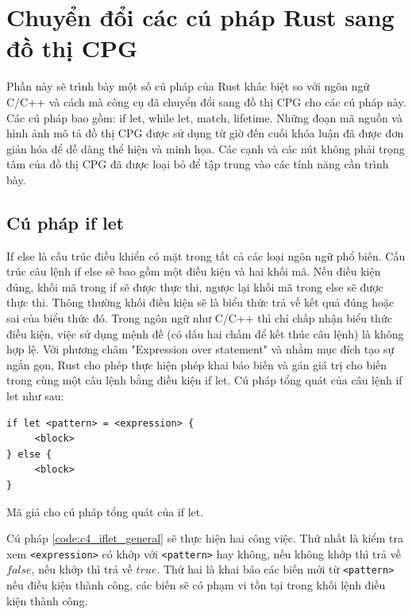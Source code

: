 \section{Chuyển đổi các cú pháp Rust sang đồ thị CPG}

Phần này sẽ trình bày một số cú pháp của Rust khác biệt so với ngôn ngữ C/C++ và cách mà công cụ đã chuyển đổi sang đồ thị CPG cho các cú pháp này.
Các cú pháp bao gồm: if let, while let, match, lifetime.
Những đoạn mã nguồn và hình ảnh mô tả đồ thị CPG được sử dụng từ giờ đến cuối khóa luận đã được đơn giản hóa để dễ dàng thể hiện và minh họa.
Các cạnh và các nút không phải trọng tâm của đồ thị CPG đã được loại bỏ để tập trung vào các tính năng cần trình bày.

\subsection{Cú pháp if let}
\label{syntax:iflet}
If else là cấu trúc điều khiển có mặt trong tất cả các loại ngôn ngữ phổ biến.
Cấu trúc câu lệnh if else sẽ bao gồm một điều kiện và hai khối mã.
Nếu điều kiện đúng, khối mã trong if sẽ được thực thi, ngược lại khối mã trong else sẽ được thực thi.
Thông thường khối điều kiện sẽ là biểu thức trả về kết quả đúng hoặc sai của biểu thức đó.
Trong ngôn ngữ như C/C++ thì chỉ chấp nhận biểu thức điều kiện, việc sử dụng mệnh đề (có dấu hai chấm để kết thúc câu lệnh) là không hợp lệ.
Với phương châm "Expression over statement" và nhằm mục đích tạo sự ngắn gọn, Rust cho phép thực hiện phép khai báo biến và gán giá trị cho biến trong cùng một câu lệnh bằng điều kiện if let.
Cú pháp tổng quát của câu lệnh if let như sau:

\begin{listing}[H]
\begin{verbatim}
if let <pattern> = <expression> {
     <block>
} else {
     <block>
}
\end{verbatim}
\caption{Mã giả cho cú pháp tổng quát của if let.}
\label{code:c4_iflet_general}
\end{listing}

Cú pháp \ref{code:c4_iflet_general} sẽ thực hiện hai công việc.
Thứ nhất là kiểm tra xem \texttt{<expression>} có khớp với \texttt{<pattern>} hay không, nếu không khớp thì trả về $false$, nếu khớp thì trả về $true$.
Thứ hai là khai báo các biến mới từ \texttt{<pattern>} nếu điều kiện thành công, các biến sẽ có phạm vi tồn tại trong khối lệnh điều kiện thành công.

